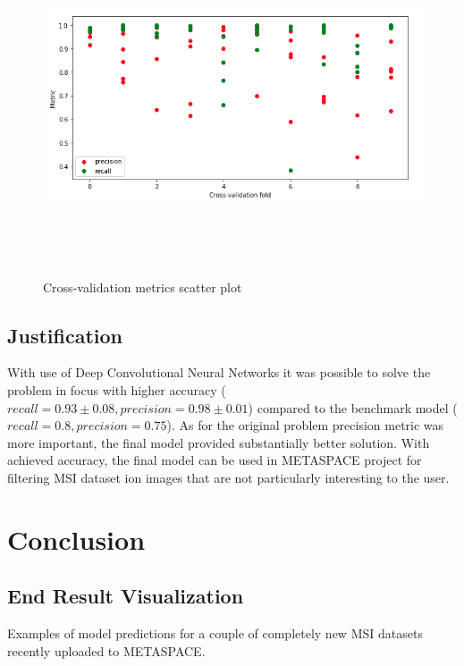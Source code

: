 \documentclass[a4paper]{article}
\begin{document}
    \begin{figure}[H]
        \centering
            \includegraphics[width=\textwidth,height=10cm,keepaspectratio]{cross-validation_scatter_plot.png}
        \caption{Cross-validation metrics scatter plot}
    \end{figure}
    
    \subsection*{Justification}
    
    With use of Deep Convolutional Neural Networks it was possible to solve the problem in focus with higher accuracy
    ($recall=0.93\pm0.08, precision=0.98\pm0.01$) compared to the benchmark model ($recall=0.8, precision=0.75$).
    As for the original problem precision metric was more important, the final model provided substantially better solution.
    With achieved accuracy, the final model can be used in METASPACE project for filtering MSI dataset ion images
    that are not particularly interesting to the user.
    
    \pagebreak
    \section*{Conclusion}
    
    \subsection*{End Result Visualization}
    
    Examples of model predictions for a couple of completely new MSI datasets recently uploaded to METASPACE.
    
\end{document}
